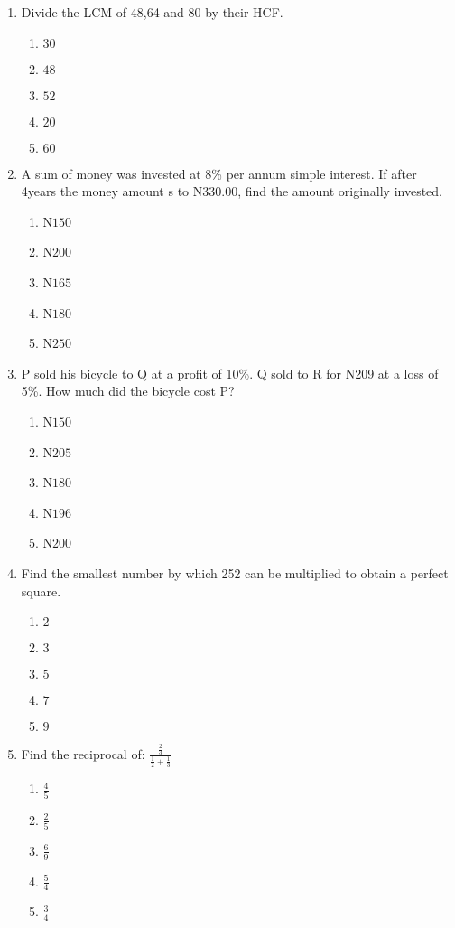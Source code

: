 \begin{multicols}{2}
\begin{enumerate}[label={\arabic*.}]
\begin{enumerate}[label={\Alph*.}]
    \end{enumerate}
\item Divide the LCM of 48,64 and 80 by their HCF.
    \begin{enumerate}[label={\Alph*.}]
    \item \(30\)
    \item \(48\)
    \item \(52\)
    \item \(20\)
    \item \(60\)

    \end{enumerate}
\item A sum of money was invested at 8\% per annum simple interest. If after 4years the money amount s to N330.00, find the amount originally invested.
    \begin{enumerate}[label={\Alph*.}]
    \item N\(150\)
    \item N\(200\)
    \item N\(165\)
    \item N\(180\)
    \item N\(250\)

    \end{enumerate}
\item P sold his bicycle to Q at a profit of 10\%. Q sold to R for N209 at a loss of 5\%. How much did the bicycle cost P? 
    \begin{enumerate}[label={\Alph*.}]
    \item N\(150\)
    \item N\(205\)
    \item N\(180\)
    \item N\(196\)
    \item N\(200\)

    \end{enumerate}
\item Find the smallest number by which 252 can be multiplied to obtain a perfect square. 
    \begin{enumerate}[label={\Alph*.}]
    \item \(2\)
    \item \(3\)
    \item \(5\)
    \item \(7\)
    \item \(9\)

    \end{enumerate}
\item Find the reciprocal of: \(\frac{\frac{2}{3}}{\frac{1}{2} + \frac{1}{3}}\)
    \begin{enumerate}[label={\Alph*.}]
    \item \(\frac{4}{5}\)
    \item \(\frac{2}{5}\)
    \item \(\frac{6}{9}\)
    \item \(\frac{5}{4}\)
    \item \(\frac{3}{4}\)


\end{enumerate}
\end{enumerate}
\end{multicols}
